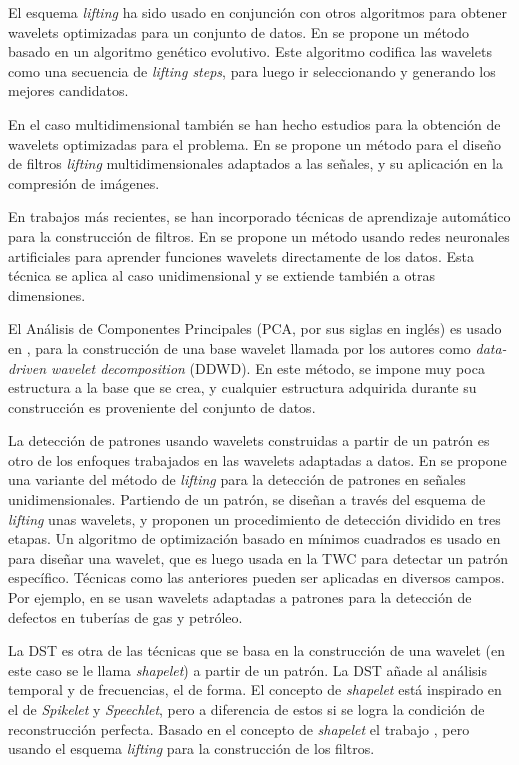 El esquema \textit{lifting} ha sido usado en conjunción con otros algoritmos para obtener wavelets 
optimizadas para un conjunto de datos.
En \cite{Grasemann2004} se propone un método basado en un algoritmo genético evolutivo. Este algoritmo codifica las wavelets
como una secuencia de \textit{lifting steps}, para luego ir seleccionando y generando los mejores 
candidatos.

En el caso multidimensional también se han hecho estudios para la obtención de wavelets optimizadas para el problema.
En \cite{Gouze2004} se propone un método para el diseño de filtros \textit{lifting} multidimensionales adaptados a las señales, y  
su aplicación en la compresión de imágenes.

En trabajos más recientes, se han incorporado técnicas de aprendizaje automático para la construcción de filtros.
En \cite{Recoskie2018} se propone un método usando redes neuronales artificiales para aprender funciones 
wavelets directamente de los datos. Esta técnica se aplica al caso unidimensional y se extiende también a otras 
dimensiones.

El Análisis de Componentes Principales (PCA, por sus siglas en inglés) es usado en \cite{floryan}, para la construcción de una base wavelet llamada por los autores como \textit{data-driven wavelet decomposition}
(DDWD). En este método, se impone muy poca estructura a la base que se crea, y cualquier estructura adquirida durante su construcción
es proveniente del conjunto de datos.

La detección de patrones usando wavelets construidas a partir de un patrón es otro de los enfoques trabajados en las wavelets adaptadas a datos.  
En \cite{Mesa2005AdaptedWF} se propone una variante del método de \textit{lifting} para la detección de patrones en señales unidimensionales.
Partiendo de un patrón, se diseñan a través del esquema de \textit{lifting} unas wavelets, y proponen un procedimiento
de detección dividido en tres etapas. Un algoritmo de optimización basado en mínimos cuadrados es usado en \cite{rpeak}
para diseñar una wavelet, que es luego usada en la TWC para detectar un patrón específico. 
Técnicas como las  anteriores pueden ser aplicadas en diversos campos. Por ejemplo, en \cite{Layouni2017} 
se usan wavelets adaptadas a 
patrones para la detección de defectos en tuberías de gas y petróleo.

La DST \cite{Guido2008} es otra de las técnicas que se basa en la construcción de una wavelet (en este caso se le llama \textit{shapelet})
a partir de un patrón. La DST añade al análisis temporal y de frecuencias, el de forma. El concepto de \textit{shapelet}
está inspirado en el de \textit{Spikelet} y \textit{Speechlet}, pero a diferencia de estos si se logra  la condición
de reconstrucción perfecta. Basado en el concepto de \textit{shapelet} el trabajo \cite{lifting-shapelet}, pero usando
el esquema \textit{lifting} para la construcción de los filtros. 

